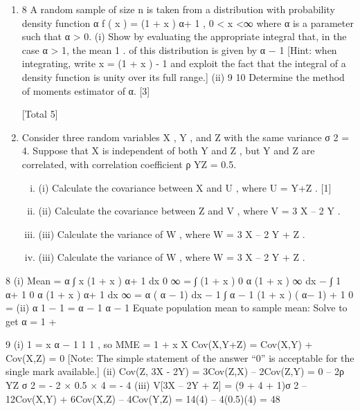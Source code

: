 \documentclass[a4paper,12pt]{article}
\begin{document}
\begin{enumerate}

\item 8
A random sample of size n is taken from a distribution with probability density
function
α
f ( x ) =
(1 + x ) α+ 1
,
0 < x <∞
where α is a parameter such that α > 0.
(i)
Show by evaluating the appropriate integral that, in the case α > 1, the mean
1
.
of this distribution is given by
α − 1
[Hint: when integrating, write x = (1 + x ) - 1 and exploit the fact that the
integral of a density function is unity over its full range.]
(ii)
9
10
Determine the method of moments estimator of α.
[3]

[Total 5]
\item Consider three random variables X , Y , and Z with the same variance σ 2 = 4. Suppose
that X is independent of both Y and Z , but Y and Z are correlated, with correlation
coefficient ρ YZ = 0.5.
\begin{enumerate}[(i)]
    \item 
(i) Calculate the covariance between X and U , where U = Y+Z . [1]
    \item (ii) Calculate the covariance between Z and V , where V = 3 X – 2 Y . 
    \item (iii) Calculate the variance of W , where W = 3 X – 2 Y + Z .

    \item (iii) Calculate the variance of W , where W = 3 X – 2 Y + Z .


\end{enumerate}
\end{enumerate}
8
(i)
Mean =
α
∫ x (1 + x ) α+ 1 dx
0
∞
=
∫ (1 + x )
0
α
(1 + x )
∞
dx − ∫ 1
α+ 1
0
α
(1 + x ) α+ 1
dx
∞
=
α
( α − 1)
dx − 1
∫
α − 1 (1 + x ) ( α− 1) + 1
0
=
(ii)
α
1
− 1 =
α − 1
α − 1
Equate population mean to sample mean:
Solve to get α = 1 +

9
(i)
1
= x
α − 1
1
1
, so MME = 1 +
x
X
Cov(X,Y+Z) = Cov(X,Y) + Cov(X,Z) = 0
[Note: The simple statement of the answer “0” is acceptable for the single
mark available.]
(ii) Cov(Z, 3X - 2Y) = 3Cov(Z,X) – 2Cov(Z,Y) = 0 – 2ρ YZ σ 2
= - 2 × 0.5 × 4 = - 4
(iii) V[3X – 2Y + Z] = (9 + 4 + 1)σ 2 – 12Cov(X,Y) + 6Cov(X,Z) – 4Cov(Y,Z)
= 14(4) – 4(0.5)(4) = 48
\end{document}
